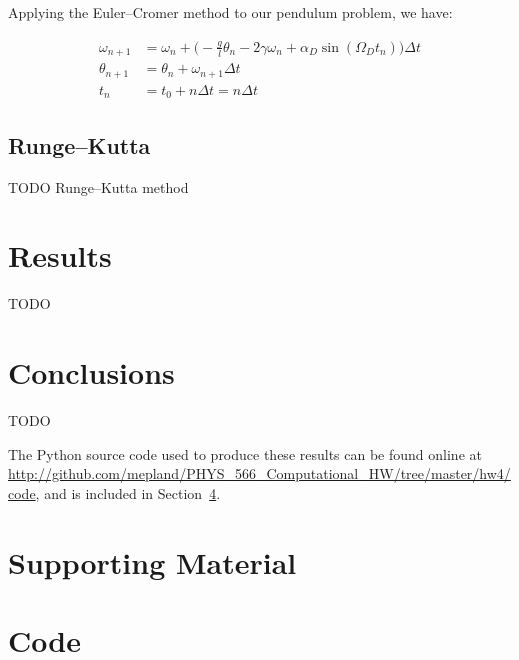 \documentclass[notitlepage,aps,prd,nofootinbib]{revtex4-1}
\begin{document}
Applying the Euler--Cromer method to our pendulum problem, we have:

\begin{align} \label{eq:euler_chromer_applied}
\omega_{n+1} &= \omega_{n} + \bigg( -\frac{g}{l}\theta_{n} - 2\gamma \omega_{n} + \alpha_{D}\sin\left(\Omega_{D} t_{n}\right)  \bigg) \Delta t \\
\theta_{n+1} &= \theta_{n} + \omega_{n+1} \Delta t \\
t_{n} &= t_{0} + n \Delta t = n \Delta t
\end{align}


\subsection{Runge--Kutta}
\label{subsec:runge_kutta}
TODO
Runge--Kutta method


\section{Results}
\label{sec:results}
TODO


\begin{comment}
\begin{figure}[!htbc]
  \centering
  \texttt{[image: ]}
	{\par\nobreak\rule[9pt]{35em}{0.5pt}\vspace{-5mm}}
	\caption{}
	\label{fig:}
\end{figure}
\end{comment}

\section{Conclusions}
\label{sec:Conclusions}
TODO

The Python source code used to produce these results can be found online at \url{http://github.com/mepland/PHYS_566_Computational_HW/tree/master/hw4/code}, and is included in Section~\ref{sec:code}.

\clearpage
\section{Supporting Material}
\label{sec:Supporting_Material}


\clearpage


\clearpage
\section{Code}
\label{sec:code}


\end{document}
